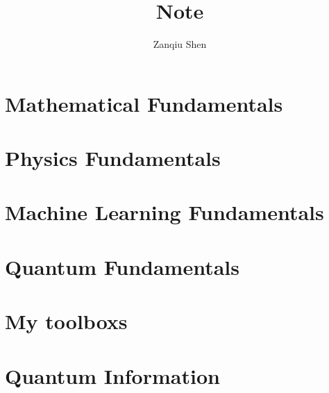 \documentclass[a4paper,11pt,openany]{book}
\numberwithin{equation}{section}
\begin{document}
\title{\textbf{Note}}
\author{Zanqiu Shen}
\maketitle
%
\tableofcontents

\setcounter{chapter}{0}
\part{Mathematical Fundamentals}





\part{Physics Fundamentals}


\part{Machine Learning Fundamentals}


\part{Quantum Fundamentals}






\part{My toolboxs}



\part{Quantum Information}




\newpage
%
%
\end{document}
